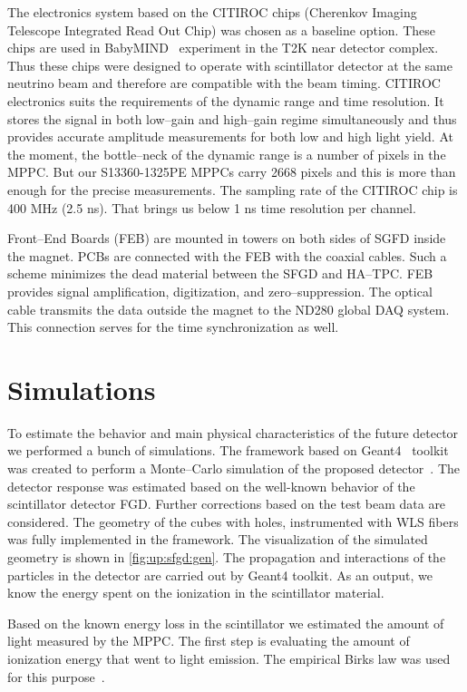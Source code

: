 \documentclass[main.tex]{subfiles}
\begin{document}
The electronics system based on the CITIROC chips (Cherenkov Imaging Telescope Integrated Read Out Chip) was chosen as a baseline option. These chips are used in BabyMIND~\cite{Blondel2015b} experiment in the T2K near detector complex. Thus these chips were designed to operate with scintillator detector at the same neutrino beam and therefore are compatible with the beam timing. CITIROC electronics suits the requirements of the dynamic range and time resolution. It stores the signal in both low--gain and high--gain regime simultaneously and thus provides accurate amplitude measurements for both low and high light yield. At the moment, the bottle--neck of the dynamic range is a number of pixels in the MPPC. But our S13360-1325PE MPPCs carry 2668 pixels and this is more than enough for the precise measurements. The sampling rate of the CITIROC chip is 400 MHz (2.5 ns). That brings us below 1 ns time resolution per channel.

Front--End Boards (FEB) are mounted in towers on both sides of SGFD inside the magnet. PCBs are connected with the FEB with the coaxial cables. Such a scheme minimizes the dead material between the SFGD and HA--TPC. FEB provides signal amplification, digitization, and zero--suppression. The optical cable transmits the data outside the magnet to the ND280 global DAQ system. This connection serves for the time synchronization as well.

\section{Simulations}
\label{sec:up:sfgd_sim}
To estimate the behavior and main physical characteristics of the future detector we performed a bunch of simulations. The framework based on Geant4~\cite{Agostinelli2003} toolkit was created to perform a Monte--Carlo simulation of the proposed detector~\cite{ndUpRepo}. The detector response was estimated based on the well-known behavior of the scintillator detector FGD. Further corrections based on the test beam data are considered. The geometry of the cubes with holes, instrumented with WLS fibers was fully implemented in the framework. The visualization of the simulated geometry is shown in \autoref{fig:up:sfgd:gen}. The propagation and interactions of the particles in the detector are carried out by Geant4 toolkit. As an output, we know the energy spent on the ionization in the scintillator material.

Based on the known energy loss in the scintillator we estimated the amount of light measured by the MPPC. The first step is evaluating the amount of ionization energy that went to light emission. The empirical Birks law was used for this purpose~\cite{Birks1951}.
\end{document}
